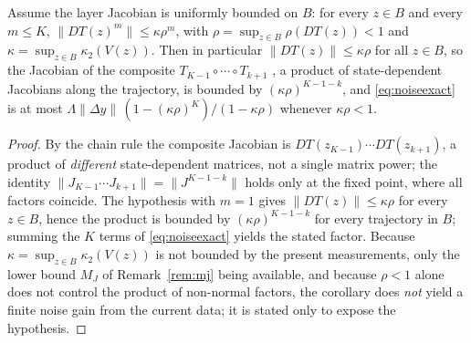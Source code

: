 \documentclass[journal,cmes,article,submit,moreauthors,pdftex]{Definitions/tsp}
\newcommand{\norm}[1]{\lVert #1 \rVert}
\begin{document}
\begin{Corollary}\label{cor:noisenormal}
Assume the layer Jacobian is uniformly bounded on $B$: for every $z\in B$ and every $m\le K$,
$\norm{DT(z)^{m}}\le\kappa\rho^{m}$, with $\rho=\sup_{z\in B}\rho(DT(z))<1$ and
$\kappa=\sup_{z\in B}\kappa_2(V(z))$. Then in particular $\norm{DT(z)}\le\kappa\rho$ for all
$z\in B$, so the Jacobian of the composite $T_{K-1}\circ\cdots\circ T_{k+1}$ , a product of state-dependent Jacobians along the trajectory, is bounded by $(\kappa\rho)^{K-1-k}$, and
\eqref{eq:noiseexact} is at most
$\Lambda\norm{\Delta y}\,(1-(\kappa\rho)^{K})/(1-\kappa\rho)$ whenever $\kappa\rho<1$.
\end{Corollary}
\begin{proof}
By the chain rule the composite Jacobian is $DT(z_{K-1})\cdots DT(z_{k+1})$, a product of
\emph{different} state-dependent matrices, not a single matrix power; the identity $\norm{J_{K-1}\cdots J_{k+1}}=\norm{J^{K-1-k}}$ holds only at the fixed point, where all factors coincide. The
hypothesis with $m=1$ gives $\norm{DT(z)}\le\kappa\rho$ for every $z\in B$, hence the product is
bounded by $(\kappa\rho)^{K-1-k}$ for every trajectory in $B$; summing the $K$ terms of
\eqref{eq:noiseexact} yields the stated factor. Because $\kappa=\sup_{z\in B}\kappa_2(V(z))$ is not bounded by the present measurements, only the lower bound $M_J$ of Remark~\ref{rem:mj} being available, and because $\rho<1$ alone does not control the product of non-normal factors, the corollary does
\emph{not} yield a finite noise gain from the current data; it is stated only to expose the hypothesis.
\end{proof}
\end{document}
